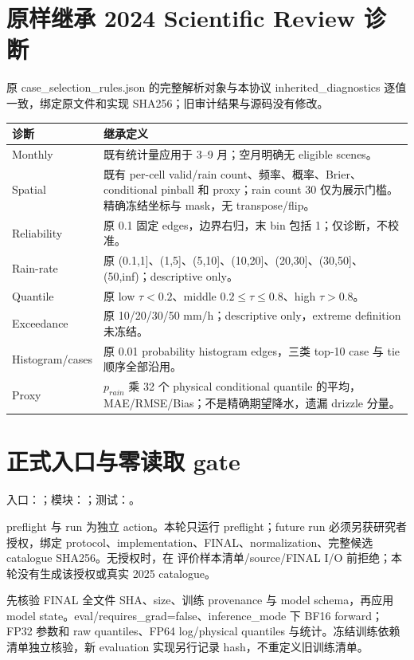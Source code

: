 \documentclass[UTF8,11pt,a4paper,fontset=windows]{ctexart}
\begin{document}
\section{原样继承 2024 Scientific Review 诊断}
原 case\_selection\_rules.json 的完整解析对象与本协议 inherited\_diagnostics 逐值一致，绑定原文件和实现 SHA256；旧审计结果与源码没有修改。
\begin{longtable}{p{28mm}p{112mm}}
\textbf{诊断} & \textbf{继承定义}\\\hline
Monthly & 既有统计量应用于 3--9 月；空月明确无 eligible scenes。\\
Spatial & 既有 per-cell valid/rain count、频率、概率、Brier、conditional pinball 和 proxy；rain count 30 仅为展示门槛。精确冻结坐标与 mask，无 transpose/flip。\\
Reliability & 原 0.1 固定 edges，边界右归，末 bin 包括 1；仅诊断，不校准。\\
Rain-rate & 原 (0.1,1]、(1,5]、(5,10]、(10,20]、(20,30]、(30,50]、(50,inf)；descriptive only。\\
Quantile & 原 low $\tau<0.2$、middle $0.2\leq\tau\leq0.8$、high $\tau>0.8$。\\
Exceedance & 原 10/20/30/50 mm/h；descriptive only，extreme definition 未冻结。\\
Histogram/cases & 原 0.01 probability histogram edges，三类 top-10 case 与 tie 顺序全部沿用。\\
Proxy & $p_{rain}$ 乘 32 个 physical conditional quantile 的平均，MAE/RMSE/Bias；不是精确期望降水，遗漏 drizzle 分量。\\\hline
\end{longtable}

\section{正式入口与零读取 gate}
入口：；模块：；测试：。

preflight 与 run 为独立 action。本轮只运行 preflight；future run 必须另获研究者授权，绑定 protocol、implementation、FINAL、normalization、完整候选 catalogue SHA256。无授权时，在 评价样本清单/source/FINAL I/O 前拒绝；本轮没有生成该授权或真实 2025 catalogue。

先核验 FINAL 全文件 SHA、size、训练 provenance 与 model schema，再应用 model state。eval/requires\_grad=false、inference\_mode 下 BF16 forward；FP32 参数和 raw quantiles、FP64 log/physical quantiles 与统计。冻结训练依赖清单独立核验，新 evaluation 实现另行记录 hash，不重定义旧训练清单。
\end{document}
